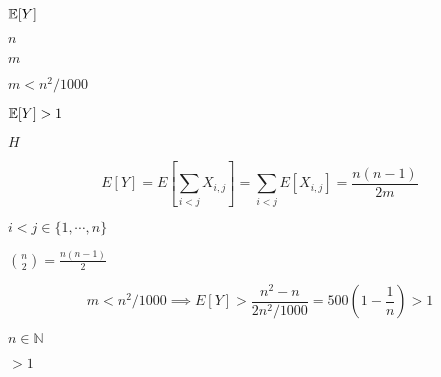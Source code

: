 \documentclass[10pt]{book}
\begin{document}
\begin{mdSnippets}
\begin{mdInlineSnippet}[b1da181621de9ed577fd6e869ce296ab]
$\mathbb{E}[ Y ]$\end{mdInlineSnippet}%
\begin{mdInlineSnippet}[7b8b965ad4bca0e41ab51de7b31363a1]%
$n$\end{mdInlineSnippet}%
\begin{mdInlineSnippet}[6f8f57715090da2632453988d9a1501b]%
$m$\end{mdInlineSnippet}%
\begin{mdInlineSnippet}[839f7920f1db22567ce7bc9da7940e10]%
$m < n^2/1000$\end{mdInlineSnippet}%
\begin{mdInlineSnippet}[6f4ccdf0c81e988e574c17911c997863]%
$\mathbb{E}[Y]>1$\end{mdInlineSnippet}%
\begin{mdInlineSnippet}[c1d9f50f86825a1a2302ec2449c17196]%
$H$\end{mdInlineSnippet}%
\begin{mdDisplaySnippet}[acb03634300db3e40ad07150ab48f539]%
\[%
E[Y] = E\left[\sum_{i < j} X_{i,j}\right] = \sum_{i < j} E[X_{i,j}] = \frac{n(n-1)}{2m}
\]%
\end{mdDisplaySnippet}%
\begin{mdInlineSnippet}[aa6a293520e3a7a6cf8930f24bf5c1df]%
$i < j \in \{1,\cdots, n\}$\end{mdInlineSnippet}%
\begin{mdInlineSnippet}[8432df5e0148b7dc952c6df3dd9cc0f7]%
${n \choose 2} = \frac{n(n-1)}{2}$\end{mdInlineSnippet}%
\begin{mdDisplaySnippet}%
\[%
m < n^2/1000 \implies E[Y] > \frac{n^2-n}{2n^2 / 1000} = 500(1 - \frac{1}{n}) > 1   
\]%
\end{mdDisplaySnippet}%
\begin{mdInlineSnippet}[d20de1fa124517c91ebb375b63ec56ee]%
$n \in \mathbb{N}$\end{mdInlineSnippet}%
\begin{mdInlineSnippet}%
$> 1$\end{mdInlineSnippet}%
\begin{mdInlineSnippet}%

\end{mdInlineSnippet}
\end{mdSnippets}
\end{document}
